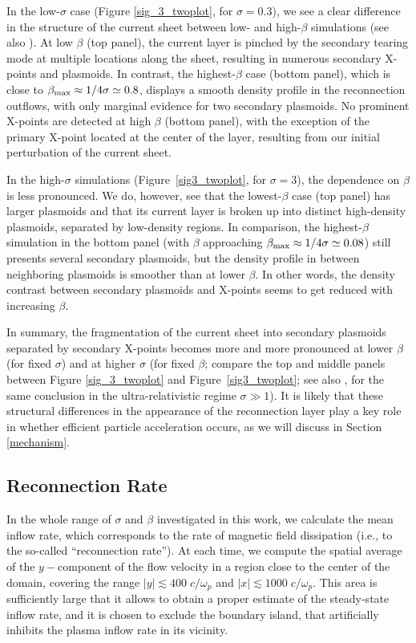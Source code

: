 In the low-$\sigma$ case (Figure \ref{sig_3_twoplot}, for $\sigma=0.3$), we see a clear difference in the structure of the current sheet between low- and high-$\beta$ simulations (see also \citealt{rowan2017}). At low $\beta$ (top panel), the current layer is pinched by the secondary tearing mode at multiple locations along the sheet, resulting in numerous secondary X-points and plasmoids. In contrast, the highest-$\beta$ case (bottom panel), which is close to $\beta_{\rm max}\approx 1/4\sigma\simeq 0.8$, displays a smooth density profile in the reconnection outflows, with only marginal evidence for two secondary plasmoids. No prominent X-points are detected at high $\beta$ (bottom panel), with the exception of the primary X-point located at the center of the layer, resulting from our initial perturbation of the current sheet.

In the high-$\sigma$ simulations (Figure~\ref{sig3_twoplot}, for $\sigma=3$), the dependence on $\beta$ is less pronounced.  We do, however, see that the lowest-$\beta$ case (top panel) has larger plasmoids and that its current layer is broken up into distinct high-density plasmoids, separated by low-density regions.  In comparison, the highest-$\beta$ simulation in the bottom panel (with $\beta$ approaching $\beta_{\rm max}\approx 1/4\sigma\simeq 0.08$) still presents several secondary plasmoids, but the density profile in between neighboring plasmoids is smoother than at lower $\beta$. In other words, the density contrast between secondary plasmoids and X-points seems to get reduced with increasing $\beta$.

In summary, the fragmentation of the current sheet into secondary plasmoids separated by secondary X-points becomes more and more pronounced at lower $\beta$ (for fixed $\sigma$) and at higher $\sigma$ (for fixed $\beta$; compare the top and middle panels between Figure \ref{sig_3_twoplot}  and Figure~\ref{sig3_twoplot}; see also \citealt{sironi2016}, for the same conclusion in the ultra-relativistic regime $\sigma\gg1$).  It is likely that these structural differences in the appearance of the reconnection layer play a key role in whether efficient particle acceleration occurs, as we will discuss in Section \ref{mechanism}.


\subsection{Reconnection Rate}
In the whole range of $\sigma$ and $\beta$ investigated in this work, we calculate the mean inflow rate, which corresponds to the rate of magnetic field dissipation (i.e., to the so-called ``reconnection rate''). At each time, we compute the spatial average of the $y-$component of the flow velocity in a region close to the center of the domain, covering the range  $|y| \lesssim 400\; c/\omega_{p}$ and $|x| \lesssim 1000\; c/\omega_{p}$. This area is sufficiently large that it allows to obtain a proper estimate of the steady-state inflow rate, and it is chosen to exclude the boundary island, that artificially inhibits the plasma inflow rate in its vicinity. 

